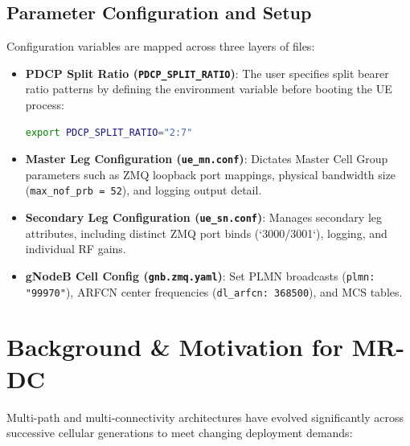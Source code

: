 \documentclass[conference]{IEEEtran}
\begin{document}
\subsection{Parameter Configuration and Setup}
Configuration variables are mapped across three layers of files:
\begin{itemize}
    \item \textbf{PDCP Split Ratio (\texttt{PDCP\_SPLIT\_RATIO})}: The user specifies split bearer ratio patterns by defining the environment variable before booting the UE process:
    \begin{lstlisting}[language=bash]
export PDCP_SPLIT_RATIO="2:7"
    \end{lstlisting}
    \item \textbf{Master Leg Configuration (\texttt{ue\_mn.conf})}: Dictates Master Cell Group parameters such as ZMQ loopback port mappings, physical bandwidth size (\texttt{max\_nof\_prb = 52}), and logging output detail.
    \item \textbf{Secondary Leg Configuration (\texttt{ue\_sn.conf})}: Manages secondary leg attributes, including distinct ZMQ port binds (`3000/3001`), logging, and individual RF gains.
    \item \textbf{gNodeB Cell Config (\texttt{gnb.zmq.yaml})}: Set PLMN broadcasts (\texttt{plmn: "99970"}), ARFCN center frequencies (\texttt{dl\_arfcn: 368500}), and MCS tables.
\end{itemize}

\section{Background \& Motivation for MR-DC}
Multi-path and multi-connectivity architectures have evolved significantly across successive cellular generations to meet changing deployment demands:
\end{document}
